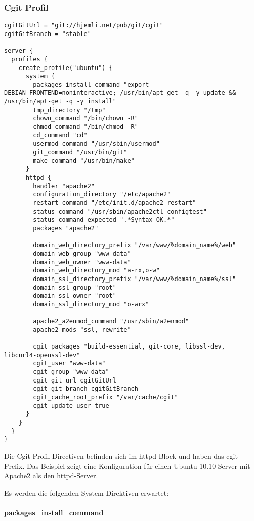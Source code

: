 \subsubsection{Cgit Profil}

\begin{lstlisting}[style=Java, caption=Beispiel Cgit Profil]
cgitGitUrl = "git://hjemli.net/pub/git/cgit"
cgitGitBranch = "stable"

server {
  profiles {
    create_profile("ubuntu") {
      system {
        packages_install_command "export DEBIAN_FRONTEND=noninteractive; /usr/bin/apt-get -q -y update && /usr/bin/apt-get -q -y install"
        tmp_directory "/tmp"
        chown_command "/bin/chown -R"
        chmod_command "/bin/chmod -R"
        cd_command "cd"
        usermod_command "/usr/sbin/usermod"
        git_command "/usr/bin/git"
        make_command "/usr/bin/make"
      }
      httpd {
        handler "apache2"
        configuration_directory "/etc/apache2"
        restart_command "/etc/init.d/apache2 restart"
        status_command "/usr/sbin/apache2ctl configtest"
        status_command_expected ".*Syntax OK.*"
        packages "apache2"

        domain_web_directory_prefix "/var/www/%domain_name%/web"
        domain_web_group "www-data"
        domain_web_owner "www-data"
        domain_web_directory_mod "a-rx,o-w"
        domain_ssl_directory_prefix "/var/www/%domain_name%/ssl"
        domain_ssl_group "root"
        domain_ssl_owner "root"
        domain_ssl_directory_mod "o-wrx"

        apache2_a2enmod_command "/usr/sbin/a2enmod"
        apache2_mods "ssl, rewrite"

        cgit_packages "build-essential, git-core, libssl-dev, libcurl4-openssl-dev"
        cgit_user "www-data"
        cgit_group "www-data"
        cgit_git_url cgitGitUrl
        cgit_git_branch cgitGitBranch
        cgit_cache_root_prefix "/var/cache/cgit"
        cgit_update_user true
      }
    }
  }
}
\end{lstlisting}

Die Cgit Profil-Directiven befinden sich im httpd-Block und haben das
cgit-Prefix. Das Beispiel zeigt eine Konfiguration für einen Ubuntu 10.10 Server
mit Apache2 als den httpd-Server.

Es werden die folgenden System-Direktiven erwartet:

\paragraph{packages\_install\_command}

